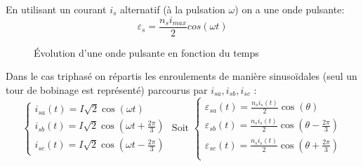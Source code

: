 \documentclass[main.tex]{subfiles}
\renewcommand{\epsilon}{\varepsilon}
\begin{document}
En utilisant un courant $i_s$ alternatif (à la pulsation $\omega$) on a une onde pulsante:
\[
  \epsilon_s =\frac{n_si_{max}}{2}cos(\omega t)
\]

\begin{figure}[H]
  \centering
  \caption{Évolution d'une onde pulsante en fonction du temps}
\end{figure}


Dans le cas triphasé on répartis les enroulements de manière sinusoïdales (seul un tour de bobinage est représenté) parcourus par $i_{sa} ,i_{sb},i_{sc}$ :
\[
  \begin{cases}
    i_{sa}(t)=I\sqrt{2}\cos(\omega t) \\
    i_{sb}(t)=I\sqrt{2}\cos(\omega t+ \frac{2\pi}{3}) \\
    i_{sc}(t)=I\sqrt{2}\cos(\omega t-\frac{2\pi}{3})
  \end{cases}
  \text{ Soit }
  \begin{cases}
    \epsilon_{sa}(t) = \frac{n_si_s(t)}{2} \cos(\theta) \\
    \epsilon_{sb}(t) = \frac{n_si_s(t)}{2} \cos(\theta-\frac{2\pi}{3}) \\
    \epsilon_{sc}(t) = \frac{n_si_s(t)}{2} \cos(\theta+\frac{2\pi}{3}) \\
  \end{cases}
\]
\end{document}
